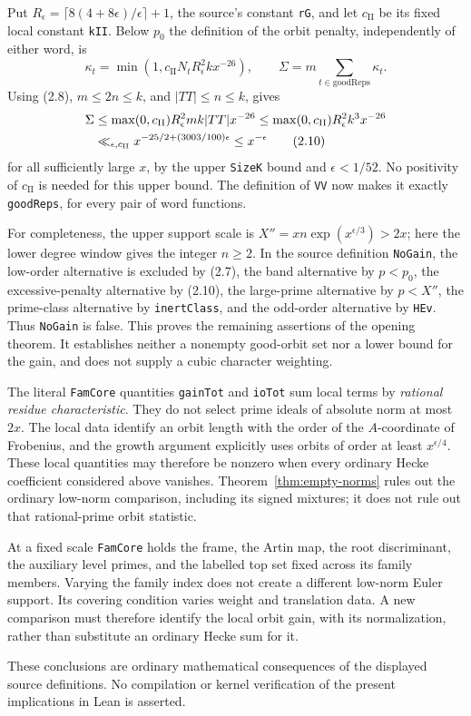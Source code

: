 Put $R_\epsilon=\lceil8(4+8\epsilon)/\epsilon\rceil+1$,
the source's constant \texttt{rG}, and let $c_{\mathrm{II}}$
be its fixed local constant \texttt{kII}. Below $p_0$ the
definition of the orbit penalty, independently of either word,
is
\[
 \kappa_t=\min(1,c_{\mathrm{II}}N_tR_\epsilon^2k x^{-26}),
 \qquad \Sigma=m\sum_{t\in\mathrm{goodReps}}\kappa_t.
                                                        \tag{2.9}
\]
Using (2.8), $m\le2n\le k$, and $|TT|\le n\le k$, gives
\begin{align}
 \Sigma&\le\max(0,c_{\mathrm{II}})R_\epsilon^2 m k|TT|x^{-26}
       \le\max(0,c_{\mathrm{II}})R_\epsilon^2 k^3x^{-26}\notag\\
 &\ll_{\epsilon,c_{\mathrm{II}}}
       x^{-25/2+(3003/100)\epsilon}\le x^{-\epsilon}
                                                        \tag{2.10}
\end{align}
for all sufficiently large $x$, by the upper \texttt{SizeK}
bound and $\epsilon<1/52$. No positivity of
$c_{\mathrm{II}}$ is needed for this upper bound.
The definition of \texttt{VV} now makes it exactly
\texttt{goodReps}, for every pair of word functions.

For completeness, the upper support scale is
$X''=xn\exp(x^{\epsilon/3})>2x$; here the lower degree window
gives the integer $n\ge2$. In the source definition
\texttt{NoGain}, the low-order alternative is excluded by
(2.7), the band alternative by $p<p_0$, the excessive-penalty
alternative by (2.10), the large-prime alternative by $p<X''$,
the prime-class alternative by \texttt{inertClass}, and the
odd-order alternative by \texttt{HEv}. Thus \texttt{NoGain}
is false. This proves the remaining assertions of the opening
theorem. It establishes neither a nonempty good-orbit set nor
a lower bound for the gain, and does not supply a cubic
character weighting.

The literal \texttt{FamCore} quantities \texttt{gainTot} and
\texttt{ioTot} sum local terms by \emph{rational residue
characteristic}. They do not select prime ideals of absolute norm
at most $2x$. The local data identify an orbit length with the
order of the $A$-coordinate of Frobenius, and the growth argument
explicitly uses orbits of order at least $x^{\epsilon/4}$.
These local quantities may therefore be nonzero when every ordinary
Hecke coefficient considered above vanishes. Theorem~\ref{thm:empty-norms}
rules out the ordinary low-norm comparison, including its signed
mixtures; it does not rule out that rational-prime orbit statistic.

At a fixed scale \texttt{FamCore} holds the frame, the Artin map,
the root discriminant, the auxiliary level primes, and the labelled
top set fixed across its family members. Varying the family index
does not create a different low-norm Euler support. Its covering
condition varies weight and translation data. A new comparison
must therefore identify the local orbit gain, with its
normalization, rather than substitute an ordinary Hecke sum for it.

These conclusions are ordinary mathematical consequences of the
displayed source definitions. No compilation or kernel verification
of the present implications in Lean is asserted.
